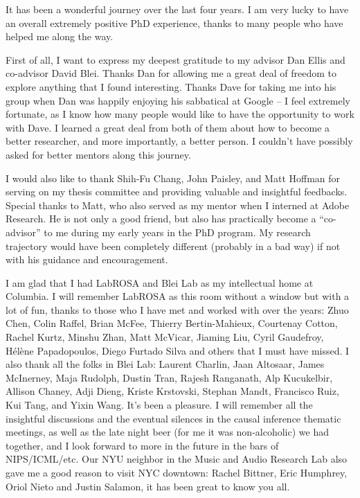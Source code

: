
It has been a wonderful journey over the last four years. I am very lucky to have an overall extremely positive PhD experience, thanks to many people who have helped me along the way.

First of all, I want to express my deepest gratitude to my advisor Dan Ellis and co-advisor David Blei. Thanks Dan for allowing me a great deal of freedom to explore anything that I found interesting. Thanks Dave for taking me into his group when Dan was happily enjoying his sabbatical at Google -- I feel extremely fortunate, as I know how many people would like to have the opportunity to work with Dave. I learned a great deal from both of them about how to become a better researcher, and more importantly, a better person. I couldn't have possibly asked for better mentors along this journey.

I would also like to thank Shih-Fu Chang, John Paisley, and Matt Hoffman for serving on my thesis committee and providing valuable and insightful feedbacks. Special thanks to Matt, who also served as my mentor when I interned at Adobe Research. He is not only a good friend, but also has practically become a ``co-advisor'' to me during my early years in the PhD program. My research trajectory would have been completely different (probably in a bad way) if not with his guidance and encouragement. 

I am glad that I had LabROSA and Blei Lab as my intellectual home at Columbia. I will remember LabROSA as this room without a window but with a lot of fun, thanks to those who I have met and worked with over the years: Zhuo Chen, Colin Raffel, Brian McFee, Thierry Bertin-Mahieux, Courtenay Cotton, Rachel Kurtz, Minshu Zhan, Matt McVicar, Jiaming Liu, Cyril Gaudefroy, H\'{e}l\`{e}ne Papadopoulos, Diego Furtado Silva and others that I must have missed. I also thank all the folks in Blei Lab: Laurent Charlin, Jaan Altosaar, James McInerney, Maja Rudolph, Dustin Tran, Rajesh Ranganath, Alp Kucukelbir, Allison Chaney, Adji Dieng, Kriste Krstovski, Stephan Mandt, Francisco Ruiz, Kui Tang, and Yixin Wang. It's been a pleasure. I will remember all the insightful discussions and the eventual silences in the causal inference thematic meetings, as well as the late night beer (for me it was non-alcoholic) we had together, and I look forward to more in the future in the bars of NIPS/ICML/etc. Our NYU neighbor in the Music and Audio Research Lab also gave me a good reason to visit NYC downtown: Rachel Bittner, Eric Humphrey, Oriol Nieto and Justin Salamon, it has been great to know you all.

